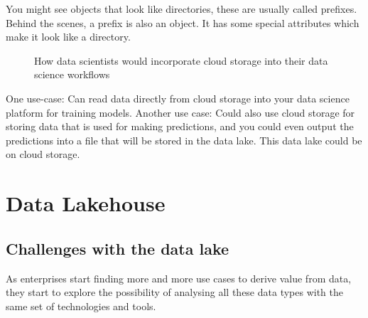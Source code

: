 \documentclass[a4paper, 11pt]{book}
\begin{document}
    You might see objects that look like directories, these are usually called prefixes.
    Behind the scenes, a prefix is also an object.
    It has some special attributes which make it look like a directory.
    \begin{figure}[ht]
        \centering
        \caption{How data scientists would incorporate cloud storage into their data science workflows}
        \label{fig:cloud storage}
    \end{figure}

    One use-case: Can read data directly from cloud storage into your data science platform for training models.
    Another use case: Could also use cloud storage for storing data that is used for making predictions, and you could even output the predictions into a file that will be stored in the data lake.
    This data lake could be on cloud storage.


    \section{Data Lakehouse}

    \subsection{Challenges with the data lake}

    As enterprises start finding more and more use cases to derive value from data, they start to explore the possibility of analysing all these data types with the same set of technologies and tools.
\end{document}
